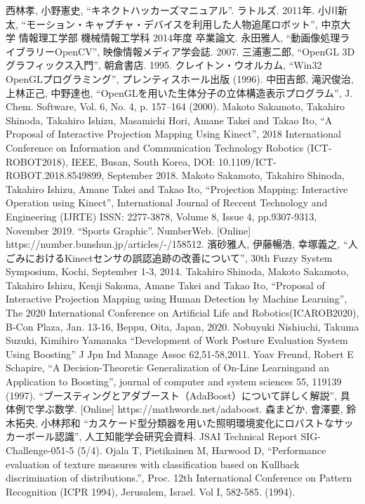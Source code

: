 \begin{thebibliography}{99}
 西林孝, 小野憲史, ``キネクトハッカーズマニュアル''. ラトルズ. 2011年.
 小川新太, ``モーション・キャプチャ・デバイスを利用した人物追尾ロボット'', 中京大学 情報理工学部 機械情報工学科 2014年度 卒業論文.
 永田雅人, ``動画像処理ライブラリーOpenCV'', 映像情報メディア学会誌. 2007.
 三浦憲二郎, ``OpenGL 3Dグラフィックス入門'', 朝倉書店. 1995.
 クレイトン・ウオルカム, ``Win32 OpenGLプログラミング'', プレンティスホール出版 (1996).
 中田吉郎, 滝沢俊治, 上林正己, 中野達也, ``OpenGLを用いた生体分子の立体構造表示プログラム'', J. Chem. Software, Vol. 6, No. 4, p. 157–164 (2000).
 Makoto Sakamoto, Takahiro Shinoda, Takahiro Ishizu, Masamichi Hori, Amane Takei and  Takao Ito, ``A Proposal of Interactive Projection Mapping Using Kinect'', 2018 International Conference on Information and Communication Technology Robotics (ICT-ROBOT2018), IEEE, Busan, South Korea, DOI: 10.1109/ICT-ROBOT.2018.8549899, September 2018.
 Makoto Sakamoto, Takahiro Shinoda, Takahiro Ishizu, Amane Takei and Takao Ito, ``Projection Mapping: Interactive Operation using Kinect'', International Journal of Reccent Technology and Engineering (IJRTE) ISSN: 2277-3878, Volume 8, Issue 4, pp.9307-9313, November 2019. 
 ``Sports Graphic''. NumberWeb. [Online] https://number.bunshun.jp/articles/-/158512.
 濱砂雅人, 伊藤暢浩, 幸塚義之, ``人ごみにおけるKinectセンサの誤認追跡の改善について'', 30th Fuzzy System Symposium, Kochi, September 1-3, 2014.
 Takahiro Shinoda, Makoto Sakamoto, Takahiro Ishizu,  Kenji Sakoma, Amane Takei and Takao Ito, ``Proposal of Interactive Projection Mapping using Human Detection by Machine Learning'', The 2020 International Conference on Artificial Life and Robotics(ICAROB2020), B-Con Plaza, Jan. 13-16, Beppu, Oita, Japan, 2020.
 Nobuyuki Nishiuchi, Takuma Suzuki, Kimihiro Yamanaka ``Development of Work Posture Evaluation System Using Boosting'' J Jpn Ind Manage Assoc 62,51-58,2011.
 Yoav Freund, Robert E Schapire, ``A Decision-Theoretic Generalization of On-Line Learningand an Application to Boosting'', journal of computer and system sciences 55, 119139 (1997).
 ``ブースティングとアダブースト（AdaBoost）について詳しく解説'', 具体例で学ぶ数学. [Online] https://mathwords.net/adaboost. 
 森まどか, 會澤要, 鈴木拓央, 小林邦和 ``カスケード型分類器を用いた照明環境変化にロバストなサッカーボール認識'', 人工知能学会研究会資料. JSAI Technical Report SIG-Challenge-051-5 (5/4).
 Ojala T, Pietikainen M, Harwood D, ``Performance evaluation of texture measures with classification based on Kullback discrimination of distributions.'', Proc. 12th International Conference on Pattern Recognition (ICPR 1994), Jerusalem, Israel. Vol I, 582-585. (1994).


\end{thebibliography}    